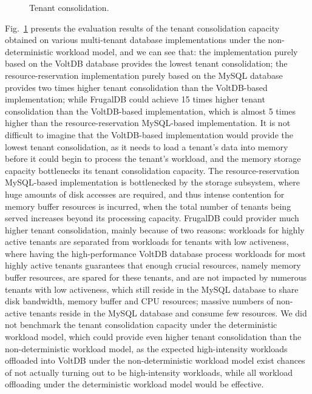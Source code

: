 \begin{figure}[!htbp]
    \caption{Tenant consolidation.}
    \label{fig:Workload-Consolidation}
\end{figure}

Fig.~\ref{fig:Workload-Consolidation} presents the evaluation results of the tenant consolidation capacity obtained on various multi-tenant database implementations under the non-deterministic workload model, and we can see that: the implementation purely based on the VoltDB database provides the lowest tenant consolidation; the resource-reservation implementation purely based on the MySQL database provides two times higher tenant consolidation than the VoltDB-based implementation; while FrugalDB could achieve 15 times higher tenant consolidation than the VoltDB-based implementation, which is almost 5 times higher than the resource-reservation MySQL-based implementation. It is not difficult to imagine that the VoltDB-based implementation would provide the lowest tenant consolidation, as it needs to load a tenant's data into memory before it could begin to process the tenant's workload, and the memory storage capacity bottlenecks its tenant consolidation capacity. The resource-reservation MySQL-based implementation is bottlenecked by the storage subsystem, where huge amounts of disk accesses are required, and thus intense contention for memory buffer resources is incurred, when the total number of tenants being served increases beyond its processing capacity. FrugalDB could provider much higher tenant consolidation, mainly because of two reasons: workloads for highly active tenants are separated from workloads for tenants with low activeness, where having the high-performance VoltDB database process workloads for most highly active tenants guarantees that enough crucial resources, namely memory buffer resources, are spared for these tenants, and are not impacted by numerous tenants with  low activeness, which still reside in the MySQL database to share disk bandwidth, memory buffer and CPU resources; massive numbers of non-active tenants reside in the MySQL database and consume few resources. We did not benchmark the tenant consolidation capacity under the deterministic workload model, which could provide even higher tenant consolidation than the non-deterministic workload model, as the expected high-intensity workloads offloaded into VoltDB under the non-deterministic workload model exist chances of not actually turning out to be high-intensity workloads, while all workload offloading under the deterministic workload model would be effective.

